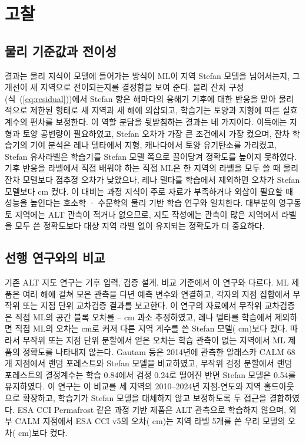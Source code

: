 \section{고찰}\label{sec:discussion}

\subsection{물리 기준값과 전이성}
결과는 물리 지식이 모델에 들어가는 방식이 ML이 지역 Stefan 모델을 넘어서는지, 그 개선이 새 지역으로 전이되는지를 결정함을 보여 준다. 물리 잔차 구성(식~(\ref{eq:residual}))에서 Stefan 항은 해마다의 융해기 기후에 대한 반응을 맡아 물리적으로 제한된 형태로 새 지역과 새 해에 외삽되고, 학습기는 토양과 지형에 따른 실효 계수의 편차를 보정한다. 이 역할 분담을 뒷받침하는 결과는 네 가지이다. 이득에는 지형과 토양 공변량이 필요하였고, Stefan 오차가 가장 큰 조건에서 가장 컸으며, 잔차 학습기의 기여 분석은 레나 델타에서 지형, 캐나다에서 토양 유기탄소를 가리켰고, Stefan 유사라벨은 학습기를 Stefan 모델 쪽으로 끌어당겨 정확도를 높이지 못하였다. 기후 반응을 라벨에서 직접 배워야 하는 직접 ML은 한 지역의 라벨을 모두 쓸 때 물리 잔차 모델보다 점추정 오차가 낮았으나, 레나 델타를 학습에서 제외하면 오차가 Stefan 모델보다 \ndrefLeregDzabs{} cm 컸다. 이 대비는 과정 지식이 주로 자료가 부족하거나 외삽이 필요할 때 성능을 높인다는 호소학 · 수문학의 물리 기반 학습 연구와 일치한다\cite{Read2019,Jia2021,Willard2022}. 대부분의 영구동토 지역에는 ALT 관측이 적거나 없으므로, 지도 작성에는 관측이 많은 지역에서 라벨을 모두 쓴 정확도보다 대상 지역 라벨 없이 유지되는 정확도가 더 중요하다.

\subsection{선행 연구와의 비교}
기존 ALT 지도 연구는 기후 입력, 검증 설계, 비교 기준에서 이 연구와 다르다. ML 제품은 여러 해에 걸쳐 모은 관측을 다년 예측 변수와 연결하고, 각자의 지점 집합에서 무작위 또는 지점 단위 교차검증 결과를 보고한다\cite{Ran2022a,Liu2024,Wei2026}. 이 연구의 자료에서 무작위 교차검증은 직접 ML의 공간 블록 오차를 \noptimLeDz--\noptimCaDz{} cm 과소 추정하였고, 레나 델타를 학습에서 제외하면 직접 ML의 오차는 \nrmseLeregDz{} cm로 커져 다른 지역 계수를 쓴 Stefan 모델(\nrmseLeregPz{} cm)보다 컸다. 따라서 무작위 또는 지점 단위 분할에서 얻은 오차는 학습 관측이 없는 지역에서 ML 제품의 정확도를 나타내지 않는다. Gautam 등\cite{Gautam2025}은 2014년에 관측한 알래스카 CALM 68개 지점에서 랜덤 포레스트와 Stefan 모델을 비교하였고, 무작위 검정 분할에서 랜덤 포레스트의 결정계수는 학습 0.84에서 검정 0.24로 떨어진 반면 Stefan 모델은 0.54를 유지하였다. 이 연구는 이 비교를 세 지역의 2010--2024년 지점-연도와 지역 홀드아웃으로 확장하고, 학습기가 Stefan 모델을 대체하지 않고 보정하도록 두 접근을 결합하였다. ESA CCI Permafrost 같은 과정 기반 제품은 ALT 관측으로 학습하지 않으며\cite{Westermann2024,Westermann2025}, 외부 CALM 지점에서 ESA CCI v5의 오차(\nftAllCcifivezero{} cm)는 지역 라벨 5개를 쓴 우리 모델의 오차(\nftAllRsfive{} cm)보다 컸다.

